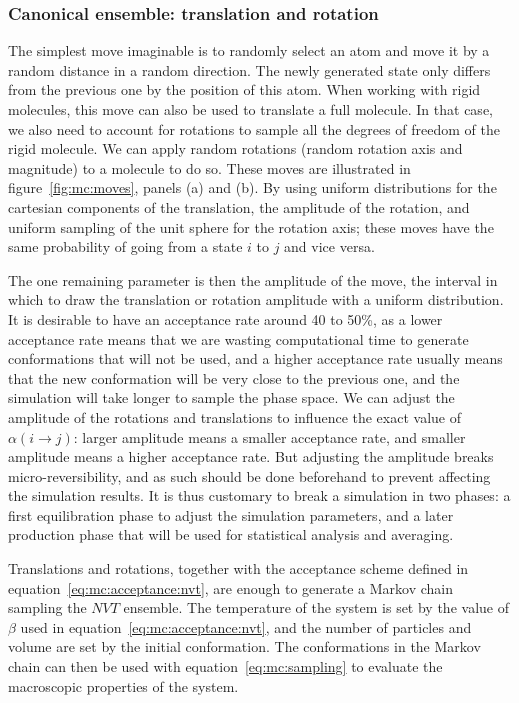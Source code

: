 \documentclass[thesis]{subfiles}
\begin{document}
\subsubsection{Canonical ensemble: translation and rotation}

The simplest move imaginable is to randomly select an atom and move it by a
random distance in a random direction. The newly generated state only differs from
the previous one by the position of this atom. When working with rigid
molecules, this move can also be used to translate a full molecule. In that
case, we also need to account for rotations to sample all the degrees of freedom
of the rigid molecule. We can apply random rotations (random rotation axis and
magnitude) to a molecule to do so. These moves are illustrated in
figure~\ref{fig:mc:moves}, panels (a) and (b). By using uniform distributions
for the cartesian components of the translation, the amplitude of the rotation,
and uniform sampling of the unit sphere for the rotation axis; these moves have
the same probability of going from a state $i$ to $j$ and vice versa.

The one remaining parameter is then the amplitude of the move, \ie the interval
in which to draw the translation or rotation amplitude with a uniform
distribution. It is desirable to have an acceptance rate around 40 to 50\%, as a
lower acceptance rate means that we are wasting computational time to generate
conformations that will not be used, and a higher acceptance rate usually means
that the new conformation will be very close to the previous one, and the
simulation will take longer to sample the phase space. We can adjust the
amplitude of the rotations and translations to influence the exact value of
$\alpha(i \to j)$: larger amplitude means a smaller acceptance rate, and smaller
amplitude means a higher acceptance rate. But adjusting the amplitude breaks
micro-reversibility, and as such should be done beforehand to prevent affecting
the simulation results. It is thus customary to break a simulation in two
phases: a first equilibration phase to adjust the simulation parameters, and a
later production phase that will be used for statistical analysis and averaging.

Translations and rotations, together with the acceptance scheme defined in
equation~\eqref{eq:mc:acceptance:nvt}, are enough to generate a Markov chain
sampling the $NVT$ ensemble. The temperature of the system is set by the value
of $\beta$ used in equation~\eqref{eq:mc:acceptance:nvt}, and the number of
particles and volume are set by the initial conformation. The conformations in
the Markov chain can then be used with equation~\eqref{eq:mc:sampling} to
evaluate the macroscopic properties of the system.
\end{document}
